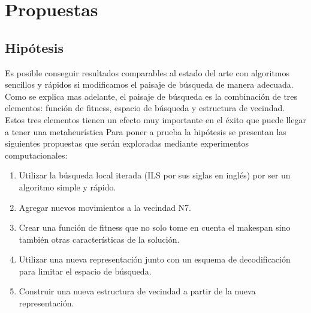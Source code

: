 \section{Propuestas}
\subsection*{Hipótesis}
Es posible conseguir resultados comparables al estado del arte con algoritmos sencillos y rápidos si modificamos el paisaje de búsqueda de manera adecuada.\\
Como se explica mas adelante, el paisaje de búsqueda es la combinación de tres elementos: función de fitness, espacio de búsqueda y estructura de vecindad. Estos tres elementos tienen un efecto muy importante en el éxito que puede llegar a tener una metaheurística
Para poner a prueba la hipótesis se presentan las siguientes propuestas que serán exploradas mediante experimentos computacionales:
\begin{enumerate}
\item Utilizar la búsqueda local iterada (ILS por sus siglas en inglés) por ser un algoritmo simple y rápido.
\item Agregar nuevos movimientos a la vecindad N7.
\item Crear una función de fitness que no solo tome en  cuenta el makespan sino también otras características de la solución.
\item Utilizar una nueva representación junto con un esquema de decodificación para limitar el espacio de búsqueda.
\item Construir una nueva estructura de vecindad a partir de la nueva representación.
\end{enumerate}
